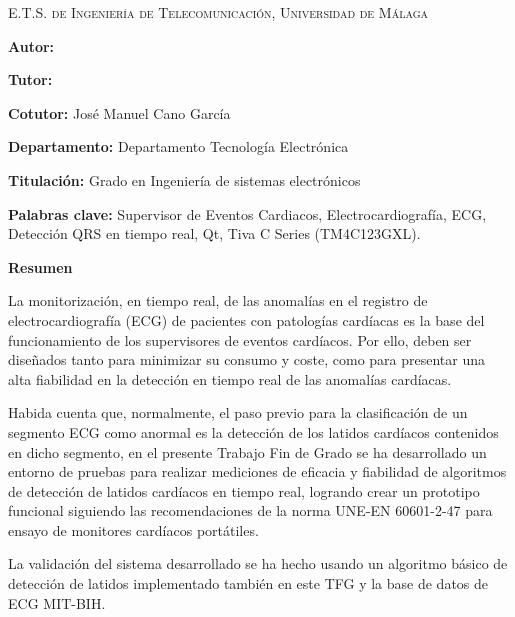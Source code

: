 
\pagestyle{fancy}
\renewcommand{\headrulewidth}{0pt}

\begin{center}
	\scshape
	E.T.S. de Ingeniería de Telecomunicación, Universidad de Málaga 
\end{center}

\bigskip

\begin{center}
	\Large \scshape
	\textbf{\tfgtitlename}
\end{center}

\bigskip \bigskip \bigskip

\begin{minipage}{\textwidth}

\textbf{Autor:} \tfgauthorname

\medskip

\textbf{Tutor:} \tfgtutorname

\medskip

\textbf{Cotutor:} José Manuel Cano García

\medskip

\textbf{Departamento:} Departamento Tecnología Electrónica

\medskip

\textbf{Titulación:} Grado en Ingeniería de sistemas electrónicos

\medskip

\textbf{Palabras clave:} Supervisor de Eventos Cardiacos, Electrocardiografía, ECG, Detección QRS en tiempo real, Qt, Tiva C Series (TM4C123GXL).

\bigskip \bigskip


\end{minipage}

\begin{center}
	\textbf{Resumen}
\end{center}

La monitorización, en tiempo real, de las anomalías en el registro de electrocardiografía (ECG) de pacientes con patologías cardíacas es la base del funcionamiento de los supervisores de eventos cardíacos. Por ello, deben ser diseñados tanto para minimizar su consumo y coste, como para presentar una alta fiabilidad en la detección en tiempo real de las anomalías cardíacas. 

Habida cuenta que, normalmente, el paso previo para la clasificación de un segmento ECG como anormal es la detección de los latidos cardíacos contenidos en dicho segmento, en el presente Trabajo Fin de Grado se ha desarrollado un entorno de pruebas para realizar mediciones de eficacia y fiabilidad de algoritmos de detección de latidos cardíacos en tiempo real, logrando crear un prototipo funcional siguiendo las recomendaciones de la norma UNE-EN 60601-2-47 para ensayo de monitores cardíacos portátiles.

La validación del sistema desarrollado se ha hecho usando un algoritmo básico de detección de latidos implementado también en este TFG y la base de datos de ECG MIT-BIH.

\blankpage

